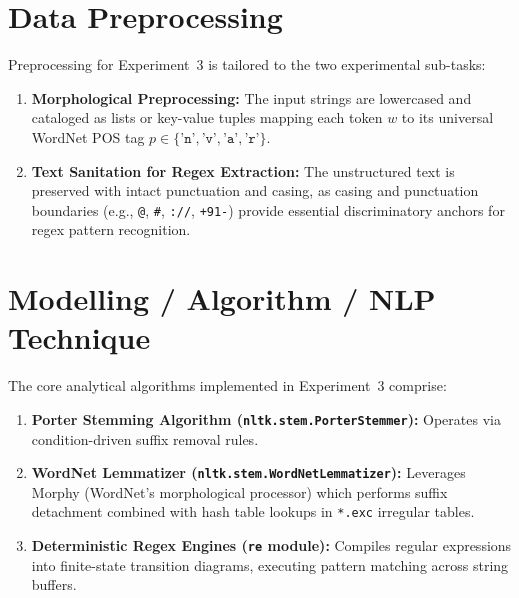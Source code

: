 \section{Data Preprocessing}
Preprocessing for Experiment~3 is tailored to the two experimental sub-tasks:
\begin{enumerate}
    \item \textbf{Morphological Preprocessing:} The input strings are lowercased and cataloged as lists or key-value tuples mapping each token $w$ to its universal WordNet POS tag $p \in \{\texttt{'n'}, \texttt{'v'}, \texttt{'a'}, \texttt{'r'}\}$.
    \item \textbf{Text Sanitation for Regex Extraction:} The unstructured text is preserved with intact punctuation and casing, as casing and punctuation boundaries (e.g., \texttt{@}, \texttt{\#}, \texttt{://}, \texttt{+91-}) provide essential discriminatory anchors for regex pattern recognition.
\end{enumerate}

\section{Modelling / Algorithm / NLP Technique}
The core analytical algorithms implemented in Experiment~3 comprise:
\begin{enumerate}
    \item \textbf{Porter Stemming Algorithm (\texttt{nltk.stem.PorterStemmer}):} Operates via condition-driven suffix removal rules.
    \item \textbf{WordNet Lemmatizer (\texttt{nltk.stem.WordNetLemmatizer}):} Leverages Morphy (WordNet's morphological processor) which performs suffix detachment combined with hash table lookups in \texttt{*.exc} irregular tables.
    \item \textbf{Deterministic Regex Engines (\texttt{re} module):} Compiles regular expressions into finite-state transition diagrams, executing pattern matching across string buffers.
\end{enumerate}

